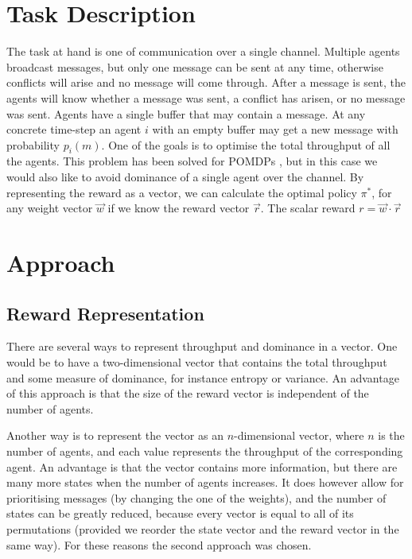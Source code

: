 \documentclass{article}
\begin{document}
	\maketitle
	\section{Task Description}
	\label{sec:task_description}
		The task at hand is one of communication over a single channel.
		Multiple agents broadcast messages, but only one message can be sent at
		any time, otherwise conflicts will arise and no message will come
		through. After a message is sent, the agents will know whether a message
		was sent, a conflict has arisen, or no message was sent.
		Agents have a single buffer that may contain a message. At any concrete
		time-step an agent $i$ with an empty buffer may get a new message with
		probability $p_i(m)$.
		One of the goals is to optimise the total throughput of all the agents.
		This problem has been solved for POMDPs \cite{ooi1996decentralized}, but
		in this case we would also like to avoid dominance of a single agent over
		the channel.  By representing the reward as a vector, we can calculate
		the optimal policy $\pi^*$, for any weight vector $\vec{w}$ if we know
		the reward vector $\vec{r}$. The scalar reward $r = \vec{w} \cdot
		\vec{r}$

	\section{Approach}
	\label{sec:approach}
		\subsection{Reward Representation}
		\label{sub:reward_representation}
		There are several ways to represent throughput and dominance in a vector.
		One would be to have a two-dimensional vector that contains the total
		throughput and some measure of dominance, for instance entropy or
		variance. An advantage of this approach is that the size of the reward
		vector is independent of the number of agents.

		Another way is to represent the vector as an $n$-dimensional vector,
		where $n$ is the number of agents, and each value represents the
		throughput of the corresponding agent. An advantage is that the vector
		contains more information, but there are many more states when the number
		of agents increases. It does however allow for prioritising messages (by
		changing the one of the weights), and the number of states can be greatly
		reduced, because every vector is equal to all of its permutations
		(provided we reorder the state vector and the reward vector in the same
		way).
		For these reasons the second approach was chosen.
\end{document}
